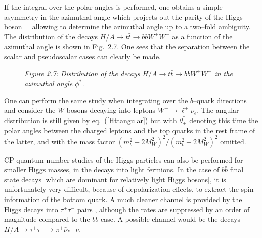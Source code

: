 If the integral over the polar angles is performed, one obtains a simple 
asymmetry in the azimuthal angle which projects out the parity of the Higgs 
boson \cite{Bargeretal,CPHff1}
\beq
{} =  
\eeq
allowing to determine the azimuthal angle up to a two--fold ambiguity. The
distribution of the decays $H/A \to t\bar{t} \to b\bar{b}W^+W^-$ as a 
function of the azimuthal angle is shown in Fig.~2.7. One sees that the 
separation between the scalar and pseudoscalar cases can clearly be made.\s

\begin{figure}[!h]
\begin{center}
\vspace*{-2.4cm}
\hspace*{-3cm}
\end{center}
\vspace*{-12.3cm}
\centerline{\it Figure 2.7: Distribution of the decays  $H/A \to t\bar{t} \to 
b\bar{b}W^+ W^-$ in the azimuthal angle $\phi^*$.}
\end{figure}
\vspace*{-.1cm}

One can perform the same study when integrating over the $b$--quark directions
and consider the $W$ bosons decaying into leptons $W^\pm \to \ell^\pm \nu_e$. 
The angular distribution is still given by eq.~(\ref{Httangular}) but with
$\theta_\pm^*$ denoting this time the polar angles between the charged leptons
and the top quarks in the rest frame of the latter, and with the mass factor
$(m_t^2-2M_W^2)^2/(m_t^2+2M_W^2)^2$ omitted. \s

CP quantum number studies of the Higgs particles can also be performed for
smaller Higgs masses, in the decays into light fermions. In the case of
$b\bar{b}$ final state decays [which are dominant for relatively light Higgs
bosons], it is unfortunately very difficult, because of depolarization effects,
to extract the spin information of the bottom quark. A much cleaner channel is
provided by the Higgs decays into $\tau^+ \tau^-$ pairs
\cite{CPHff1,CPHff4,CPHff3}, although the rates are suppressed by an order of
magnitude compared to the $b\bar{b}$ case. A possible channel would be the
decays $H/A \to \tau^+ \tau^- \to \pi^+ \bar{\nu} \pi^- \nu$. \s

